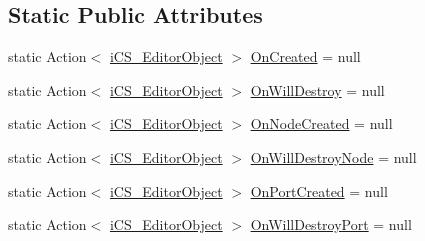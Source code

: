 \subsection*{Static Public Attributes}
\begin{DoxyCompactItemize}
\item 
static Action$<$ \hyperlink{classi_c_s___editor_object}{i\+C\+S\+\_\+\+Editor\+Object} $>$ \hyperlink{classi_c_s___editor_object_ac9c459b38bf502848353476c3cbcf2f4}{On\+Created} = null
\item 
static Action$<$ \hyperlink{classi_c_s___editor_object}{i\+C\+S\+\_\+\+Editor\+Object} $>$ \hyperlink{classi_c_s___editor_object_a8173d5b3de1ba851d96187be67bca66b}{On\+Will\+Destroy} = null
\item 
static Action$<$ \hyperlink{classi_c_s___editor_object}{i\+C\+S\+\_\+\+Editor\+Object} $>$ \hyperlink{classi_c_s___editor_object_a8e1697566edb5c60f8968f1f14fa9476}{On\+Node\+Created} = null
\item 
static Action$<$ \hyperlink{classi_c_s___editor_object}{i\+C\+S\+\_\+\+Editor\+Object} $>$ \hyperlink{classi_c_s___editor_object_a01c354cafdafdba95a627e78e2379781}{On\+Will\+Destroy\+Node} = null
\item 
static Action$<$ \hyperlink{classi_c_s___editor_object}{i\+C\+S\+\_\+\+Editor\+Object} $>$ \hyperlink{classi_c_s___editor_object_a7d084565e0fa3eb5ea0eecc75b7b0303}{On\+Port\+Created} = null
\item 
static Action$<$ \hyperlink{classi_c_s___editor_object}{i\+C\+S\+\_\+\+Editor\+Object} $>$ \hyperlink{classi_c_s___editor_object_a0f23e29098a2d25b239475a81bbc5ef9}{On\+Will\+Destroy\+Port} = null
\end{DoxyCompactItemize}
